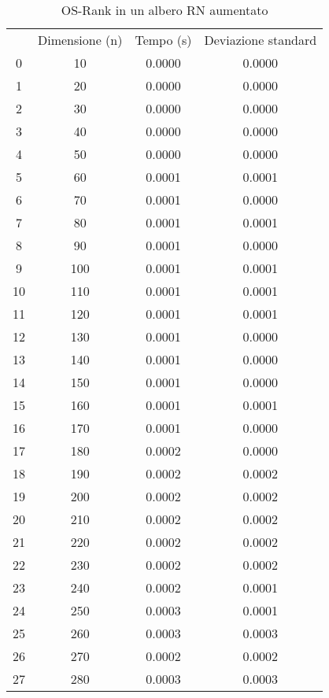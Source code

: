 \begin{table}
\centering
\caption{OS-Rank in un albero RN aumentato}
\label{OS-Rank in un albero RN aumentato}
\begin{adjustbox}{width=1\textwidth/2}
\begin{tabular}{|c|c|c|c|}
\hline
 & Dimensione (n) & Tempo (s) & Deviazione standard \\
0 & 10 & 0.0000 & 0.0000 \\
\cline{1-4}
1 & 20 & 0.0000 & 0.0000 \\
\cline{1-4}
2 & 30 & 0.0000 & 0.0000 \\
\cline{1-4}
3 & 40 & 0.0000 & 0.0000 \\
\cline{1-4}
4 & 50 & 0.0000 & 0.0000 \\
\cline{1-4}
5 & 60 & 0.0001 & 0.0001 \\
\cline{1-4}
6 & 70 & 0.0001 & 0.0000 \\
\cline{1-4}
7 & 80 & 0.0001 & 0.0001 \\
\cline{1-4}
8 & 90 & 0.0001 & 0.0000 \\
\cline{1-4}
9 & 100 & 0.0001 & 0.0001 \\
\cline{1-4}
10 & 110 & 0.0001 & 0.0001 \\
\cline{1-4}
11 & 120 & 0.0001 & 0.0001 \\
\cline{1-4}
12 & 130 & 0.0001 & 0.0000 \\
\cline{1-4}
13 & 140 & 0.0001 & 0.0000 \\
\cline{1-4}
14 & 150 & 0.0001 & 0.0000 \\
\cline{1-4}
15 & 160 & 0.0001 & 0.0001 \\
\cline{1-4}
16 & 170 & 0.0001 & 0.0000 \\
\cline{1-4}
17 & 180 & 0.0002 & 0.0000 \\
\cline{1-4}
18 & 190 & 0.0002 & 0.0002 \\
\cline{1-4}
19 & 200 & 0.0002 & 0.0002 \\
\cline{1-4}
20 & 210 & 0.0002 & 0.0002 \\
\cline{1-4}
21 & 220 & 0.0002 & 0.0002 \\
\cline{1-4}
22 & 230 & 0.0002 & 0.0002 \\
\cline{1-4}
23 & 240 & 0.0002 & 0.0001 \\
\cline{1-4}
24 & 250 & 0.0003 & 0.0001 \\
\cline{1-4}
25 & 260 & 0.0003 & 0.0003 \\
\cline{1-4}
26 & 270 & 0.0002 & 0.0002 \\
\cline{1-4}
27 & 280 & 0.0003 & 0.0003 \\

\end{tabular}
\end{adjustbox}
\end{table}
